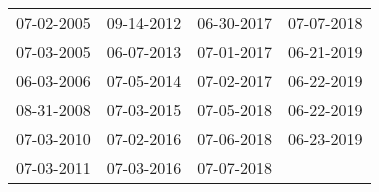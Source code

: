 \begin{supertabular}{llll}
 07-02-2005 &  09-14-2012 &  06-30-2017 &  07-07-2018 \\
 07-03-2005 &  06-07-2013 &  07-01-2017 &  06-21-2019 \\
 06-03-2006 &  07-05-2014 &  07-02-2017 &  06-22-2019 \\
 08-31-2008 &  07-03-2015 &  07-05-2018 &  06-22-2019 \\
 07-03-2010 &  07-02-2016 &  07-06-2018 &  06-23-2019 \\
 07-03-2011 &  07-03-2016 &  07-07-2018 &             \\
\end{supertabular}
